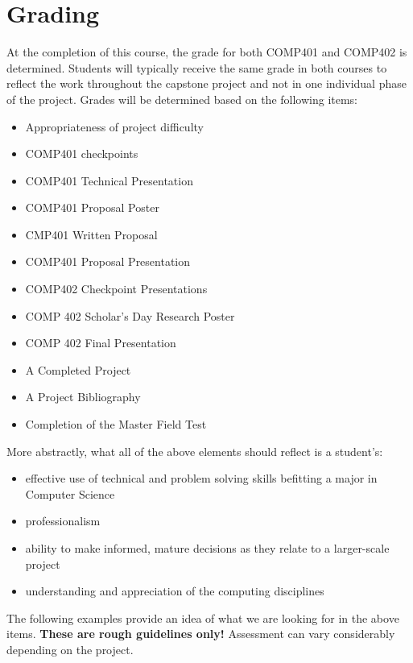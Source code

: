 \documentclass[]{article}
\begin{document}
\section{Grading}

At the completion of this course, the grade for both COMP401 and COMP402 is determined. Students will typically receive the same grade in both courses to reflect the work throughout the capstone project and not in one individual phase of the project. Grades will be determined based on the following items:
\begin{itemize}
\item Appropriateness of project difficulty
\item COMP401 checkpoints
\item COMP401 Technical Presentation
\item COMP401 Proposal Poster
\item CMP401 Written Proposal
\item COMP401 Proposal Presentation
\item COMP402 Checkpoint Presentations
\item COMP 402 Scholar's Day Research Poster
\item COMP 402 Final Presentation
\item A Completed Project
\item A Project Bibliography
\item Completion of the Master Field Test
\end{itemize}

More abstractly, what all of the above elements should reflect is a student's:
\begin{itemize}
\item effective use of technical and problem solving skills befitting a major in Computer Science
\item professionalism
\item ability to make informed, mature decisions as they relate to a larger-scale project
\item understanding and appreciation of the computing disciplines
\end{itemize}

The following examples provide an idea of what we are looking for in
the above items. \textbf{These are rough guidelines only!} Assessment
can vary considerably depending on the project.
\end{document}
